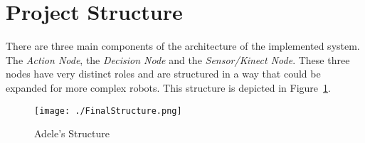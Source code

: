 \section{Project Structure}

There are three main components of the architecture of the implemented system. The \textit{Action Node}, the \textit{Decision Node} and the \textit{Sensor/Kinect Node}. These three nodes have very distinct roles and are structured in a way that could be expanded for more complex robots. This structure is depicted in Figure~\ref{fig:adele_structure}.

\begin{figure}[!ht]
    \centering
    \texttt{[image: ./FinalStructure.png]}
    \caption{Adele's Structure}
    \label{fig:adele_structure}
\end{figure}




